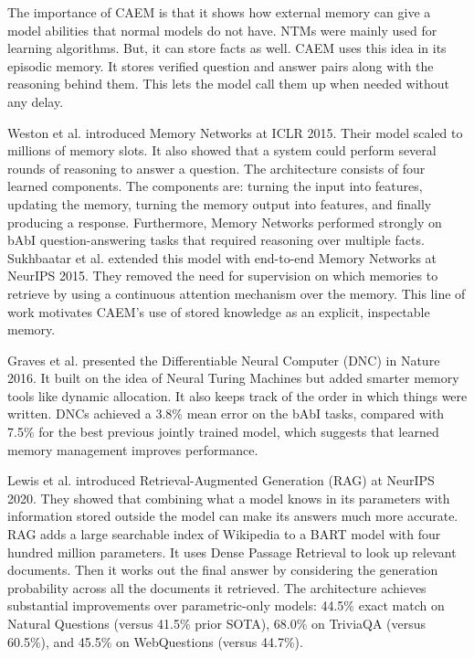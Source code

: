 The importance of CAEM is that it shows how external memory can give a model abilities that normal models do not have. NTMs were mainly used for learning algorithms. But, it can store facts as well. CAEM uses this idea in its episodic memory. It stores verified question and answer pairs along with the reasoning behind them. This lets the model call them up when needed without any delay.

Weston et al. \cite{weston2015memory} introduced Memory Networks at ICLR 2015. Their model scaled to millions of memory slots. It also showed that a system could perform several rounds of reasoning to answer a question. The architecture consists of four learned components. The components are: turning the input into features, updating the memory, turning the memory output into features, and finally producing a response. Furthermore, Memory Networks performed strongly on bAbI question-answering tasks that required reasoning over multiple facts. Sukhbaatar et al. \cite{NIPS2015_8fb21ee7} extended this model with end-to-end Memory Networks at NeurIPS 2015. They removed the need for supervision on which memories to retrieve by using a continuous attention mechanism over the memory. This line of work motivates CAEM's use of stored knowledge as an explicit, inspectable memory.

Graves et al. \cite{graves2016differentiable} presented the Differentiable Neural Computer (DNC) in Nature 2016. It built on the idea of Neural Turing Machines but added smarter memory tools like dynamic allocation. It also keeps track of the order in which things were written. DNCs achieved a 3.8\% mean error on the bAbI tasks, compared with 7.5\% for the best previous jointly trained model, which suggests that learned memory management improves performance.

Lewis et al. \cite{NEURIPS2020_6b493230} introduced Retrieval-Augmented Generation (RAG) at NeurIPS 2020. They showed that combining what a model knows in its parameters with information stored outside the model can make its answers much more accurate. RAG adds a large searchable index of Wikipedia to a BART model with four hundred million parameters. It uses Dense Passage Retrieval to look up relevant documents. Then it works out the final answer by considering the generation probability across all the documents it retrieved. The architecture achieves substantial improvements over parametric-only models: 44.5\% exact match on Natural Questions (versus 41.5\% prior SOTA), 68.0\% on TriviaQA (versus 60.5\%), and 45.5\% on WebQuestions (versus 44.7\%).

